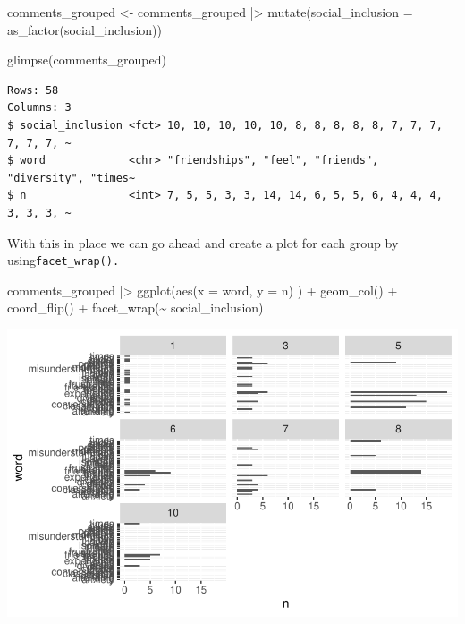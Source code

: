 \documentclass[
  letterpaper,
]{krantz}
\makeatletter
\newenvironment{Shaded}{\begin{snugshade}}{\end{snugshade}}
\newcommand{\AttributeTok}[1]{\textcolor[rgb]{0.40,0.45,0.13}{#1}}
\newcommand{\FunctionTok}[1]{\textcolor[rgb]{0.28,0.35,0.67}{#1}}
\newcommand{\NormalTok}[1]{\textcolor[rgb]{0.00,0.23,0.31}{#1}}
\newcommand{\OtherTok}[1]{\textcolor[rgb]{0.00,0.23,0.31}{#1}}
\newcommand{\SpecialCharTok}[1]{\textcolor[rgb]{0.37,0.37,0.37}{#1}}
\newenvironment{kframe}{%
\medskip{}
\setlength{\fboxsep}{.8em}
 \def\at@end@of@kframe{}%
 \ifinner\ifhmode%
  \def\at@end@of@kframe{\end{minipage}}%
  \begin{minipage}{\columnwidth}%
 \fi\fi%
 \def\FrameCommand##1{\hskip\@totalleftmargin \hskip-\fboxsep
 \colorbox{shadecolor}{##1}\hskip-\fboxsep
     \hskip-\linewidth \hskip-\@totalleftmargin \hskip\columnwidth}%
 \MakeFramed {\advance\hsize-\width
   \@totalleftmargin\z@ \linewidth\hsize
   \@setminipage}}%
 {\par\unskip\endMakeFramed%
 \at@end@of@kframe}
\renewenvironment{Shaded}{\begin{kframe}}{\end{kframe}}
\makeatother
\begin{document}
\begin{Shaded}
\begin{Highlighting}[]
\NormalTok{comments\_grouped }\OtherTok{\textless{}{-}}
\NormalTok{  comments\_grouped }\SpecialCharTok{|\textgreater{}}
  \FunctionTok{mutate}\NormalTok{(}\AttributeTok{social\_inclusion =} \FunctionTok{as\_factor}\NormalTok{(social\_inclusion))}

\FunctionTok{glimpse}\NormalTok{(comments\_grouped)}
\end{Highlighting}
\end{Shaded}

\begin{verbatim}
Rows: 58
Columns: 3
$ social_inclusion <fct> 10, 10, 10, 10, 10, 8, 8, 8, 8, 8, 7, 7, 7, 7, 7, 7, ~
$ word             <chr> "friendships", "feel", "friends", "diversity", "times~
$ n                <int> 7, 5, 5, 3, 3, 14, 14, 6, 5, 5, 6, 4, 4, 4, 3, 3, 3, ~
\end{verbatim}

With this in place we can go ahead and create a plot for each group by
using\texttt{facet\_wrap().}

\begin{Shaded}
\begin{Highlighting}[]
\NormalTok{comments\_grouped }\SpecialCharTok{|\textgreater{}}
  \FunctionTok{ggplot}\NormalTok{(}\FunctionTok{aes}\NormalTok{(}\AttributeTok{x =}\NormalTok{ word,}
             \AttributeTok{y =}\NormalTok{ n)}
\NormalTok{         ) }\SpecialCharTok{+}
  \FunctionTok{geom\_col}\NormalTok{() }\SpecialCharTok{+}
  \FunctionTok{coord\_flip}\NormalTok{() }\SpecialCharTok{+}
  \FunctionTok{facet\_wrap}\NormalTok{(}\SpecialCharTok{\textasciitilde{}}\NormalTok{ social\_inclusion)}
\end{Highlighting}
\end{Shaded}

\includegraphics{14_mixed_methods_files/figure-pdf/visualise-social-inclusion-groups-words-n-01-1.pdf}
\end{document}
